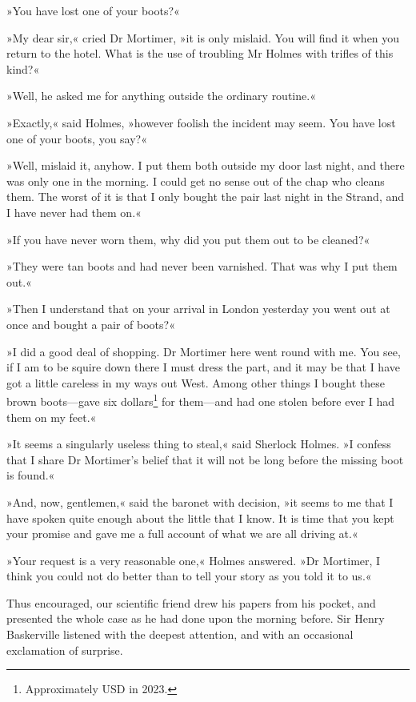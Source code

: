 »You have lost one of your boots?«

»My dear sir,« cried Dr Mortimer, »it is only mislaid. You will find it when you return to the hotel. What is the use of troubling Mr Holmes with trifles of this kind?«

»Well, he asked me for anything outside the ordinary routine.«

»Exactly,« said Holmes, »however foolish the incident may seem. You have lost one of your boots, you say?«

»Well, mislaid it, anyhow. I put them both outside my door last night, and there was only one in the morning. I could get no sense out of the chap who cleans them. The worst of it is that I only bought the pair last night in the Strand, and I have never had them on.«

»If you have never worn them, why did you put them out to be cleaned?«

»They were tan boots and had never been varnished. That was why I put them out.«

»Then I understand that on your arrival in London yesterday you went out at once and bought a pair of boots?«

»I did a good deal of shopping. Dr Mortimer here went round with me. You see, if I am to be squire down there I must dress the part, and it may be that I have got a little careless in my ways out West. Among other things I bought these brown boots—gave six dollars\footnote{Approximately  USD in 2023.} for them—and had one stolen before ever I had them on my feet.«

»It seems a singularly useless thing to steal,« said Sherlock Holmes. »I confess that I share Dr Mortimer's belief that it will not be long before the missing boot is found.«

»And, now, gentlemen,« said the baronet with decision, »it seems to me that I have spoken quite enough about the little that I know. It is time that you kept your promise and gave me a full account of what we are all driving at.«

»Your request is a very reasonable one,« Holmes answered. »Dr Mortimer, I think you could not do better than to tell your story as you told it to us.«

Thus encouraged, our scientific friend drew his papers from his pocket, and presented the whole case as he had done upon the morning before. Sir Henry Baskerville listened with the deepest attention, and with an occasional exclamation of surprise.

